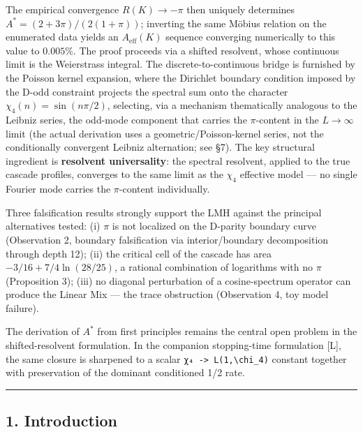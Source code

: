 \documentclass[
  11pt,
]{article}
\begin{document}
The empirical convergence \(R(K) \to -\pi\) then uniquely determines
\(A^{\ast} = (2 + 3\pi)/(2(1+\pi))\); inverting the same Möbius relation on the
enumerated data yields an \(A_{\mathrm{eff}}(K)\) sequence converging
numerically to this value to \(0.005\%\). The proof proceeds via a shifted
resolvent, whose continuous limit is the Weierstrass integral. The
discrete-to-continuous bridge is furnished by the Poisson kernel expansion,
where the Dirichlet boundary condition imposed by the D-odd constraint projects
the spectral sum onto the character \(\chi_4(n) = \sin(n\pi/2)\), selecting, via
a mechanism thematically analogous to the Leibniz series, the odd-mode component
that carries the \(\pi\)-content in the \(L \to \infty\) limit (the actual
derivation uses a geometric/Poisson-kernel series, not the conditionally
convergent Leibniz alternation; see §7). The key structural ingredient is
\textbf{resolvent universality}: the spectral resolvent, applied to the true
cascade profiles, converges to the same limit as the \(\chi_4\) effective model
--- no single Fourier mode carries the \(\pi\)-content individually.

Three falsification results strongly support the LMH against the principal
alternatives tested: (i) \(\pi\) is not localized on the D-parity boundary curve
(Observation 2, boundary falsification via interior/boundary decomposition
through depth 12); (ii) the critical cell of the cascade has area
\(-3/16 + 7/4\ln(28/25)\), a rational combination of logarithms with no \(\pi\)
(Proposition 3); (iii) no diagonal perturbation of a cosine-spectrum operator
can produce the Linear Mix --- the trace obstruction (Observation 4, toy model
failure).

The derivation of \(A^{\ast}\) from first principles remains the central open
problem in the shifted-resolvent formulation. In the companion stopping-time
formulation {[}L{]}, the same closure is sharpened to a scalar
\texttt{χ₄\ -\textgreater{}\ L(1,\textbackslash{}chi\_4)} constant together with
preservation of the dominant conditioned 1/2 rate.

\begin{center}\rule{0.5\linewidth}{0.5pt}\end{center}

\newpage

\subsection{1. Introduction}\label{introduction}
\end{document}
